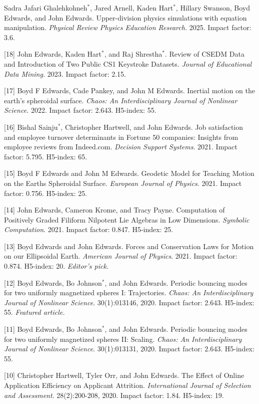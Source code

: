 \documentclass[margin,line]{res}
\newcommand{\pubunder}[1]{#1}
\newcommand{\jnum}[1]{[#1]}
\begin{document}
\begin{resume}
\jnum{19} Sadra Jafari Ghalehkohneh$^*$, Jared Arnell, Kaden Hart$^*$, Hillary Swanson, Boyd Edwards, and John Edwards. Upper-division physics simulations with equation manipulation. \textit{Physical Review Physics Education Research.} 2025. Impact factor: 3.6.

\jnum{18} John Edwards, Kaden Hart$^*$, and Raj Shrestha$^*$. Review of CSEDM Data and Introduction of Two Public CS1 Keystroke Datasets. \textit{Journal of Educational Data Mining.} 2023. Impact factor: 2.15.

\jnum{17} Boyd F Edwards, Cade Pankey, and John M Edwards. Inertial motion on the earth’s spheroidal surface. \textit{Chaos: An Interdisciplinary Journal of Nonlinear Science.} 2022. Impact factor: 2.643. H5-index: 55.

\jnum{16} Bishal Sainju$^*$, Christopher Hartwell, and John Edwards. Job satisfaction and employee turnover determinants in Fortune 50 companies: Insights from employee reviews from Indeed.com. \textit{Decision Support Systems}. 2021. Impact factor: 5.795. H5-index: 65.

\jnum{15} Boyd F Edwards and John M Edwards. Geodetic Model for Teaching Motion on the Earths Spheroidal Surface. \textit{European Journal of Physics}. 2021. Impact factor: 0.756. H5-index: 25.

\jnum{14} John Edwards, Cameron Krome, and Tracy Payne. Computation of Positively Graded Filiform Nilpotent Lie Algebras in Low Dimensions. \textit{Symbolic Computation}. 2021. Impact factor: 0.847. H5-index: 25.

\jnum{13} Boyd Edwards and John Edwards. Forces and Conservation Laws for Motion on our Ellipsoidal Earth. \textit{American Journal of Physics}. 2021. Impact factor: 0.874. H5-index: 20. \textit{Editor's pick.}

\jnum{12} Boyd Edwards, Bo Johnson$^*$, and \pubunder{John Edwards}. Periodic bouncing modes for two uniformly magnetized spheres I: Trajectories. \textit{Chaos: An Interdisciplinary Journal of Nonlinear Science}. 30(1):013146, 2020. Impact factor: 2.643. H5-index: 55. \textit{Featured article.}

\jnum{11} Boyd Edwards, Bo Johnson$^*$, and \pubunder{John Edwards}. Periodic bouncing modes for two uniformly magnetized spheres II: Scaling. \textit{Chaos: An Interdisciplinary Journal of Nonlinear Science}. 30(1):013131, 2020. Impact factor: 2.643. H5-index: 55. 

\jnum{10} Christopher Hartwell, Tyler Orr, and \pubunder{John Edwards}. The Effect of Online Application Efficiency on Applicant Attrition. \textit{International Journal of Selection and Assessment}. 28(2):200-208, 2020. Impact factor: 1.84. H5-index: 19.


\end{resume}
\end{document}

